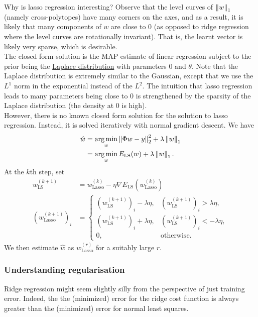 \documentclass{article}
\begin{document}
			Why is lasso regression interesting? Observe that the level curves of $\left\lVert w\right\rVert_1$ (namely cross-polytopes) have many corners on the axes, and as a result, it is likely that many components of $w$ are close to $0$ (as opposed to ridge regression where the level curves are rotationally invariant). That is, the learnt vector is likely very sparse, which is desirable.\\
			The closed form solution is the MAP estimate of linear regression subject to the prior being the \href{https://en.wikipedia.org/wiki/Laplace_distribution}{Laplace distribution} with parameters $0$ and $\theta$. Note that the Laplace distribution is extremely similar to the Gaussian, except that we use the $L^1$ norm in the exponential instead of the $L^2$. The intuition that lasso regression leads to many parameters being close to $0$ is strengthened by the sparsity of the Laplace distribution (the density at $0$ is high).\\
			However, there is no known closed form solution for the solution to lasso regression. Instead, it is solved iteratively with normal gradient descent. We have
			\begin{align*}
				\hat{w} &= \operatorname*{arg\,min}_w \left\lVert\Phi w - y\right\rVert_2^2 + \lambda\left\lVert w\right\rVert_1 \\
					&= \operatorname*{arg\,min}_w E_{\text{LS}}(w) + \lambda\left\lVert w\right\rVert_1.
			\end{align*}
			At the $k$th step, set
			\begin{align*}
				w_{\text{LS}}^{(k+1)} &= w_{\text{Lasso}}^{(k)} - \eta\nabla E_\text{LS}(w_\text{Lasso}^{(k)}) \\
				(w_\text{Lasso}^{(k+1)})_{i} &=
				\begin{cases}
					(w_\text{LS}^{(k+1)})_i - \lambda\eta, & (w_\text{LS}^{(k+1)})_i > \lambda\eta, \\
					(w_\text{LS}^{(k+1)})_i + \lambda\eta, & (w_\text{LS}^{(k+1)})_i < -\lambda\eta, \\
					0, & \text{otherwise.}
				\end{cases}
			\end{align*}
			We then estimate $\hat{w}$ as $w_\text{Lasso}^{(r)}$ for a suitably large $r$.

		\subsubsection{Understanding regularisation}

			Ridge regression might seem slightly silly from the perspective of just training error. Indeed, the the (minimized) error for the ridge cost function is always greater than the (minimized) error for normal least squares.\\
\end{document}
